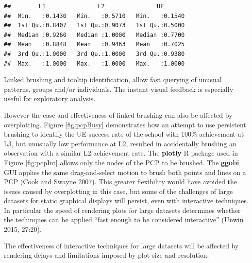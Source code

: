 \documentclass[]{book}
\theoremstyle{definition}
\theoremstyle{definition}
\theoremstyle{definition}
\theoremstyle{remark}
\begin{document}
\begin{verbatim}
##        L1               L2               UE        
##  Min.   :0.1430   Min.   :0.5710   Min.   :0.1540  
##  1st Qu.:0.8407   1st Qu.:0.9073   1st Qu.:0.5000  
##  Median :0.9260   Median :1.0000   Median :0.7700  
##  Mean   :0.8848   Mean   :0.9463   Mean   :0.7025  
##  3rd Qu.:1.0000   3rd Qu.:1.0000   3rd Qu.:0.9380  
##  Max.   :1.0000   Max.   :1.0000   Max.   :1.0000
\end{verbatim}

\begin{boxed}
Linked brushing and tooltip identification, allow fast querying of
unusual patterns, groups and/or individuals. The instant visual feedback
is especially useful for exploratory analysis.
\end{boxed}

However the ease and effectiveness of linked brushing can also be
affected by overplotting. Figure \ref{fig:pcpBusy} demonstrates how an
attempt to use persistent brushing to identify the UE success rate of
the school with 100\% achievement at L3, but unusually low performance
at L2, resulted in accidentally brushing an observation with a similar
L2 achievement rate. The \textbf{plotly} R package used in Figure
\ref{fig:pcpInt} allows only the nodes of the PCP to be brushed. The
\textbf{ggobi} GUI applies the same drag-and-select motion to brush both
points and lines on a PCP (Cook and Swayne 2007). This greater
flexibility would have avoided the issues caused by overplotting in this
case, but some of the challenges of large datasets for static graphical
displays will persist, even with interactive techniques. In particular
the speed of rendering plots for large datasets determines whether the
techinques can be applied ``fast enough to be considered interactive''
(Unwin 2015, 27:20).

\begin{boxed}
The effectiveness of interactive techniques for large datasets will be
affected by rendering delays and limitations imposed by plot size and
resolution.
\end{boxed}
\end{document}
